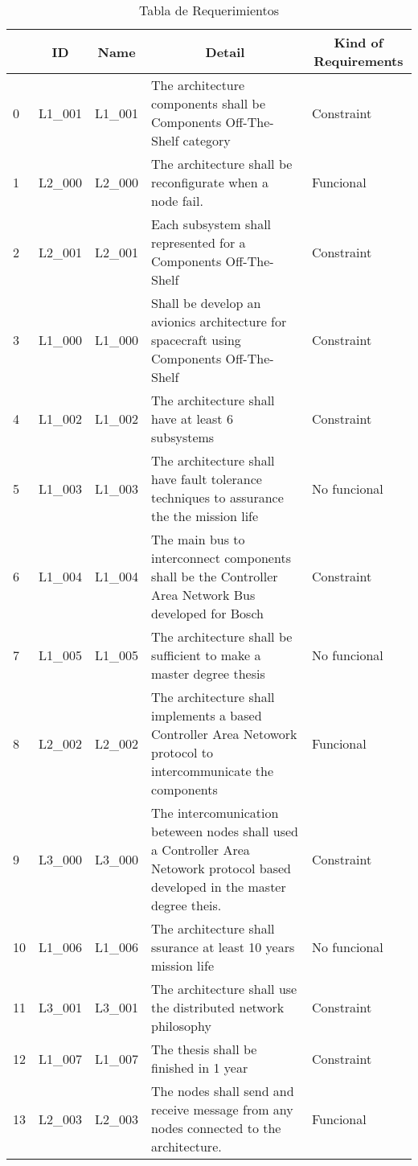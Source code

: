 \begin{table}[]
\small
\centering
\caption{Tabla de Requerimientos}
\label{table:Requerimientos}
\begin{tabular}{|l|l|l|p{7cm}|p{2cm}|}
\hline
\multicolumn{1}{|c|}{\textbf{}} & \multicolumn{1}{c|}{\textbf{ID}} & \multicolumn{1}{c|}{\textbf{Name}} & \multicolumn{1}{c|}{\textbf{Detail}} & \multicolumn{1}{c|}{\textbf{Kind of Requirements}} \\ \hline
0 & L1\_001 & L1\_001 & The architecture components shall be Components Off-The-Shelf category & Constraint \\ \hline
1 & L2\_000 & L2\_000 & The architecture shall be reconfigurate when a node fail. & Funcional \\ \hline
2 & L2\_001 & L2\_001 & Each subsystem shall represented for a Components Off-The-Shelf & Constraint \\ \hline
3 & L1\_000 & L1\_000 & Shall be develop an avionics architecture for spacecraft using Components Off-The-Shelf & Constraint \\ \hline
4 & L1\_002 & L1\_002 & The architecture shall have at least 6 subsystems & Constraint \\ \hline
5 & L1\_003 & L1\_003 & The architecture shall have fault tolerance techniques to assurance the the mission life & No funcional \\ \hline
6 & L1\_004 & L1\_004 & The main bus to interconnect components shall be the Controller Area Network Bus developed for Bosch & Constraint \\ \hline
7 & L1\_005 & L1\_005 & The architecture shall be sufficient to make a master degree thesis & No funcional \\ \hline
8 & L2\_002 & L2\_002 & The architecture shall implements a based Controller Area Netowork protocol to intercommunicate the components & Funcional \\ \hline
9 & L3\_000 & L3\_000 & The intercomunication beteween nodes shall used a Controller Area Netowork protocol based developed in the master degree theis. & Constraint\\ \hline
10 & L1\_006 & L1\_006 & The architecture shall ssurance at least 10 years mission life & No funcional \\ \hline
11 & L3\_001 & L3\_001 & The architecture shall use the distributed network philosophy & Constraint \\ \hline
12 & L1\_007 & L1\_007 & The thesis shall be finished in 1 year & Constraint \\ \hline
13 & L2\_003 & L2\_003 & The nodes shall send and receive message from any nodes connected to the architecture. & Funcional \\ \hline
\end{tabular}%
\end{table}

